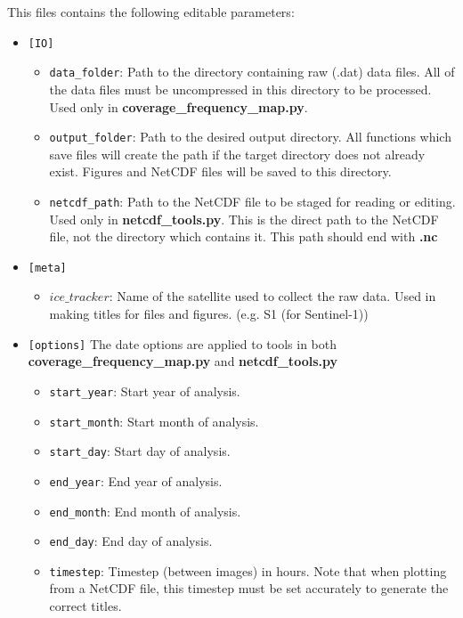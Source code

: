 \documentclass{article}
\begin{document}
            This files contains the following editable parameters:
            \begin{itemize}
                \item{} \verb?[IO]?
                \begin{itemize}
                    \item \verb?data_folder?: Path to the directory containing raw (.dat) data files. All of the data files must be uncompressed in this directory to be processed. Used only in \textbf{coverage\_frequency\_map.py}.
                    \item \verb?output_folder?: Path to the desired output directory. All functions which save files will create the path if the target directory does not already exist. Figures and NetCDF files will be saved to this directory.
                    \item \verb?netcdf_path?: Path to the NetCDF file to be staged for reading or editing. Used only in \textbf{netcdf\_tools.py}. This is the direct path to the NetCDF file, not the directory which contains it. This path should end with \textbf{.nc}
                \end{itemize}
                \item{} \verb?[meta]?
                \begin{itemize}
                    \item $ice\_tracker$: Name of the satellite used to collect the raw data. Used in making titles for files and figures. (e.g. S1 (for Sentinel-1))
                \end{itemize}
                \item{} \verb?[options]?
                The date options are applied to tools in both \textbf{coverage\_frequency\_map.py} and \textbf{netcdf\_tools.py}
                \begin{itemize}
                    \item \verb?start_year?: Start year of analysis.
                    \item \verb?start_month?: Start month of analysis.
                    \item \verb?start_day?: Start day of analysis.
                    \item \verb?end_year?: End year of analysis.
                    \item \verb?end_month?: End month of analysis.
                    \item \verb?end_day?: End day of analysis.
                    \item \verb?timestep?: Timestep (between images) in hours. Note that when plotting from a NetCDF file, this timestep must be set accurately to generate the correct titles.

\end{itemize}
\end{itemize}
\end{document}

